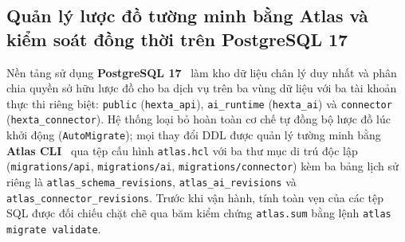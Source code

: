 \subsection{Quản lý lược đồ tường minh bằng Atlas và kiểm soát đồng thời trên PostgreSQL 17}
Nền tảng sử dụng \textbf{PostgreSQL 17}~\cite{postgres17docs} làm kho dữ liệu chân lý duy nhất và phân chia quyền sở hữu lược đồ cho ba dịch vụ trên ba vùng dữ liệu với ba tài khoản thực thi riêng biệt:
\texttt{public} (\texttt{hexta\_\hspace{0pt}api}), \texttt{ai\_\hspace{0pt}runtime} (\texttt{hexta\_\hspace{0pt}ai}) và \texttt{connector} (\texttt{hexta\_\hspace{0pt}connector}). Hệ thống loại bỏ hoàn toàn cơ chế tự đồng bộ lược đồ lúc khởi
động (\texttt{AutoMigrate}); mọi thay đổi DDL được quản lý tường minh bằng \textbf{Atlas CLI}~\cite{atlasdocs} qua tệp cấu hình \texttt{atlas.\hspace{0pt}hcl} với ba thư mục di trú độc lập (\texttt{migrations/\hspace{0pt}api},
\texttt{migrations/\hspace{0pt}ai}, \texttt{migrations/\hspace{0pt}connector}) kèm ba bảng lịch sử riêng là \texttt{atlas\_\hspace{0pt}schema\_\hspace{0pt}revisions}, \texttt{atlas\_\hspace{0pt}ai\_\hspace{0pt}revisions} và
\texttt{atlas\_\hspace{0pt}connector\_\hspace{0pt}revisions}. Trước khi vận hành, tính toàn vẹn của các tệp SQL được đối chiếu chặt chẽ qua băm kiểm chứng \texttt{atlas.\hspace{0pt}sum} bằng lệnh \texttt{atlas migrate validate}.


